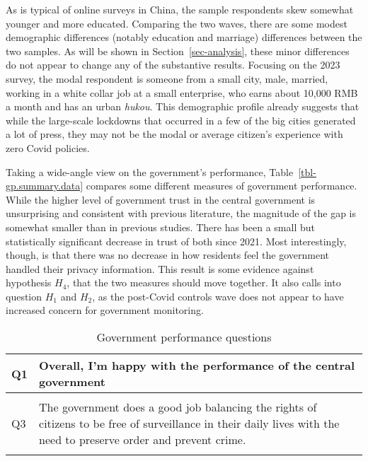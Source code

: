 \documentclass[
  letterpaper,
  DIV=11,
  numbers=noendperiod]{scrartcl}
\begin{document}
As is typical of online surveys in China, the sample respondents skew
somewhat younger and more educated. Comparing the two waves, there are
some modest demographic differences (notably education and marriage)
differences between the two samples. As will be shown in
Section~\ref{sec-analysis}, these minor differences do not appear to
change any of the substantive results. Focusing on the 2023 survey, the
modal respondent is someone from a small city, male, married, working in
a white collar job at a small enterprise, who earns about 10,000 RMB a
month and has an urban \emph{hukou}. This demographic profile already
suggests that while the large-scale lockdowns that occurred in a few of
the big cities generated a lot of press, they may not be the modal or
average citizen's experience with zero Covid policies.

Taking a wide-angle view on the government's performance,
Table~\ref{tbl-gp.summary.data} compares some different measures of
government performance. While the higher level of government trust in
the central government is unsurprising and consistent with previous
literature, the magnitude of the gap is somewhat smaller than in
previous studies. There has been a small but statistically significant
decrease in trust of both since 2021. Most interestingly, though, is
that there was no decrease in how residents feel the government handled
their privacy information. This result is some evidence against
hypothesis \(H_4\), that the two measures should move together. It also
calls into question \(H_1\) and \(H_2\), as the post-Covid controls wave
does not appear to have increased concern for government monitoring.

\hypertarget{tbl-gp.q.text}{}
\begin{table}
\caption{\label{tbl-gp.q.text}Government performance questions }\tabularnewline

\centering
\begin{tabular}[t]{l|>{\raggedright\arraybackslash}p{5in}}
\hline
Q1 & Overall, I’m happy with the performance of the central government\\
\hline
\cellcolor{gray!6}{Q2} & \cellcolor{gray!6}{Overall, I’m happy with the performance of my local government}\\
\hline
Q3 & The government does a good job balancing the rights of citizens to be free of surveillance in their daily lives with the need to preserve order and prevent crime.\\
\hline
\cellcolor{gray!6}{Q4} & \cellcolor{gray!6}{Government performance index of Q1 + Q2 + Q3}\\
\hline
\end{tabular}
\end{table}
\end{document}
